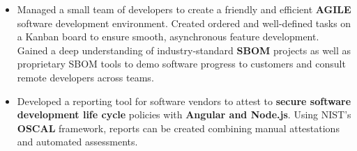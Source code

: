 \documentclass[10pt,a4paper,ragged2e]{altacv}
\begin{document}
\begin{itemize}
\item Managed a small team of developers to create a friendly and efficient \textbf{AGILE} software development environment. Created ordered and well-defined tasks on a Kanban board to ensure smooth, asynchronous feature development. Gained a deep understanding of industry-standard \textbf{SBOM} projects as well as proprietary SBOM tools to demo software progress to customers and consult remote developers across teams.
\item Developed a reporting tool for software vendors to attest to \textbf{secure software development life cycle} policies with \textbf{Angular and Node.js}. Using NIST's \textbf{OSCAL} framework, reports can be created combining manual attestations and automated assessments.
\end{itemize}
\divider


\end{document}
